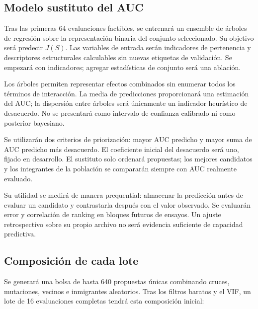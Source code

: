 \documentclass[11pt,letterpaper]{article}
\begin{document}
\subsection{Modelo sustituto del AUC}\label{sec:6.4}

Tras las primeras 64 evaluaciones factibles, se entrenará un ensemble de árboles de regresión sobre la representación binaria del conjunto seleccionado. Su objetivo será predecir \(J(S)\). Las variables de entrada serán indicadores de pertenencia y descriptores estructurales calculables sin nuevas etiquetas de validación. Se empezará con indicadores; agregar estadísticas de conjunto será una ablación.

Los árboles permiten representar efectos combinados sin enumerar todos los términos de interacción. La media de predicciones proporcionará una estimación del AUC; la dispersión entre árboles será únicamente un indicador heurístico de desacuerdo. No se presentará como intervalo de confianza calibrado ni como posterior bayesiano.

Se utilizarán dos criterios de priorización: mayor AUC predicho y mayor suma de AUC predicho más desacuerdo. El coeficiente inicial del desacuerdo será uno, fijado en desarrollo. El sustituto solo ordenará propuestas; los mejores candidatos y los integrantes de la población se compararán siempre con AUC realmente evaluado.

Su utilidad se medirá de manera prequential: almacenar la predicción antes de evaluar un candidato y contrastarla después con el valor observado. Se evaluarán error y correlación de ranking en bloques futuros de ensayos. Un ajuste retrospectivo sobre su propio archivo no será evidencia suficiente de capacidad predictiva.

\subsection{Composición de cada lote}\label{sec:6.5}

Se generará una bolsa de hasta 640 propuestas únicas combinando cruces, mutaciones, vecinos e inmigrantes aleatorios. Tras los filtros baratos y el VIF, un lote de 16 evaluaciones completas tendrá esta composición inicial:
\end{document}
